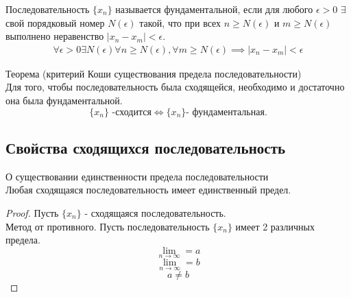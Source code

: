 \begin{definition}
  Последовательность $\{x_{n}\} $ называется фундаментальной, если для любого $\epsilon > 0$ $\exists $ свой порядковый номер $N(\epsilon)$ такой, что при всех $n \ge N(\epsilon)$ и $m \ge  N(\epsilon)$ выполнено неравенство $|x_{n} - x_{m}| < \epsilon$.
  \begin{align*}
    \forall \epsilon > 0 \exists N(\epsilon) \forall n \ge N(\epsilon), \forall m \ge N(\epsilon) \implies |x_{n} - x_{m}| < \epsilon
  \end{align*}
\end{definition}

\begin{theorem}
  Теорема (критерий Коши существования предела последовательности) \\
  Для того, чтобы последовательность была сходящейся, необходимо и достаточно она была фундаментальной.
  \[
    \{x_{n}\} \text{ -сходится} \iff \{x_{n}\} \text{- фундаментальная}
  .\] 
\end{theorem}

\subsection{Свойства сходящихся последовательность}

\begin{theorem}
  О существовании единственности предела последовательности \\
  Любая сходящаяся последовательность имеет единственный предел.
\end{theorem}
\begin{proof}
  Пусть $\{x_{n}\} $ - сходящаяся последовательность. \\
  Метод от противного. Пусть последовательность $\{x_{n}\} $ имеет 2 различных предела.
  \begin{equation}
    \lim_{n \to \infty} = a
  \end{equation}
  \begin{equation}
    \lim_{n \to \infty} = b
  \end{equation}
  \[
    a \neq b
  \]
\end{proof}

